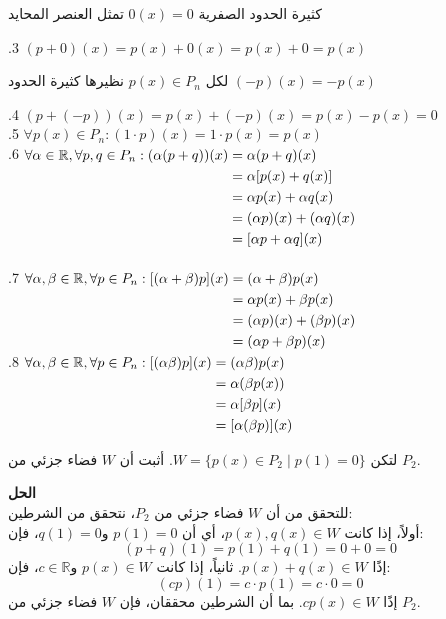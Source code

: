 \setRL
\noindent
كثيرة الحدود الصفرية $0(x)=0 $ تمثل العنصر المحايد 

\setLR

\noindent
.3 $(p+0)(x) = p(x) + 0(x) = p(x) + 0 = p(x)$

\setRL
\noindent
لكل $p(x)\in P_n$ نظيرها كثيرة الحدود $(-p)(x) = -p(x)$ 

\setLR
\noindent
.4 $(p+(-p))(x) = p(x) + (-p)(x) = p(x) - p(x) = 0$\\
.5 $\forall p(x) \in P_n : (1\cdot p)(x) = 1\cdot p(x) = p(x)$\\
.6 $
\begin{aligned}[t]
	\forall\alpha\in\mathbb{R}, \forall p,q\in P_n : (\alpha(p+q))(x)
	&= \alpha (p+q)(x)\\
	&= \alpha[p(x) + q(x)]\\
	&= \alpha p(x) + \alpha q(x)\\
	&= (\alpha p)(x) + (\alpha q)(x)\\
	&= [\alpha p + \alpha q](x)
\end{aligned}
$\\
\\
.7 $
\begin{aligned}[t]
	\forall\alpha,\beta\in\mathbb{R}, \forall p\in P_n : [(\alpha + \beta)p](x)
	&= (\alpha+\beta)p(x)\\
	&= \alpha p(x) + \beta p(x)\\
	&= (\alpha p)(x) + (\beta p)(x)\\
	&= (\alpha p + \beta p)(x) 
\end{aligned}
$\\
.8 $
\begin{aligned}[t]
	\forall\alpha,\beta\in\mathbb{R}, \forall p\in P_n : [(\alpha  \beta)p](x)
	&= (\alpha\beta)p(x)\\
	&= \alpha (\beta p(x))\\
	&= \alpha [\beta p](x)\\
	&= [\alpha(\beta p)](x)
\end{aligned}
$

\setRL
\begin{example}
	لتكن $W = \{ p(x) \in P_2 \mid p(1) = 0 \}$. أثبت أن $W$ فضاء جزئي من $P_2$.
\end{example}
\noindent
\textbf{الحل}\\
\noindent
	للتحقق من أن $W$ فضاء جزئي من 
	$P_2$، نتحقق من الشرطين:\\
	\noindent
	أولاً، إذا كانت $p(x), q(x) \in W$، أي أن $p(1) = 0$ و$q(1) = 0$، فإن:
	\[
	(p + q)(1) = p(1) + q(1) = 0 + 0 = 0
	\]
	إذًا $p(x) + q(x) \in W$.
	ثانياً، إذا كانت $p(x) \in W$ و$c \in \mathbb{R}$، فإن:
	\[
	(cp)(1) = c \cdot p(1) = c \cdot 0 = 0
	\]
	إذًا $cp(x) \in W$.
	بما أن الشرطين محققان، فإن $W$ فضاء جزئي من 
	$P_2$.


